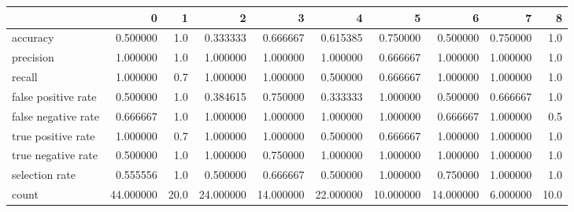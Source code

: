 \begin{tabular}{lrrrrrrrrr}
\toprule
{} &          0 &     1 &          2 &          3 &          4 &          5 &          6 &         7 &     8 \\
\midrule
accuracy            &   0.500000 &   1.0 &   0.333333 &   0.666667 &   0.615385 &   0.750000 &   0.500000 &  0.750000 &   1.0 \\
precision           &   1.000000 &   1.0 &   1.000000 &   1.000000 &   1.000000 &   0.666667 &   1.000000 &  1.000000 &   1.0 \\
recall              &   1.000000 &   0.7 &   1.000000 &   1.000000 &   0.500000 &   0.666667 &   1.000000 &  1.000000 &   1.0 \\
false positive rate &   0.500000 &   1.0 &   0.384615 &   0.750000 &   0.333333 &   1.000000 &   0.500000 &  0.666667 &   1.0 \\
false negative rate &   0.666667 &   1.0 &   1.000000 &   1.000000 &   1.000000 &   1.000000 &   0.666667 &  1.000000 &   0.5 \\
true positive rate  &   1.000000 &   0.7 &   1.000000 &   1.000000 &   0.500000 &   0.666667 &   1.000000 &  1.000000 &   1.0 \\
true negative rate  &   0.500000 &   1.0 &   1.000000 &   0.750000 &   1.000000 &   1.000000 &   1.000000 &  1.000000 &   1.0 \\
selection rate      &   0.555556 &   1.0 &   0.500000 &   0.666667 &   0.500000 &   1.000000 &   0.750000 &  1.000000 &   1.0 \\
count               &  44.000000 &  20.0 &  24.000000 &  14.000000 &  22.000000 &  10.000000 &  14.000000 &  6.000000 &  10.0 \\
\bottomrule
\end{tabular}
